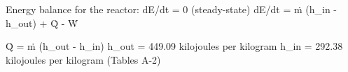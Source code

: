 Energy balance for the reactor:  
dE/dt = 0 (steady-state)  
dE/dt = ṁ (h_in - h_out) + Q̇ - Ẇ  

Q̇ = ṁ (h_out - h_in)  
h_out = 449.09 kilojoules per kilogram  
h_in = 292.38 kilojoules per kilogram  
(Tables A-2)
